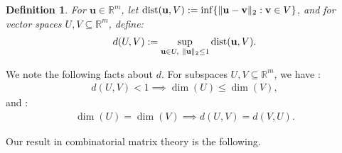 \documentclass[9pt,twocolumn]{pnas-new}
\newtheorem{lemma}{Lemma}
\newtheorem{definition}{Definition}
\begin{document}
\begin{definition}\label{dDef}
For $\mathbf{u} \in \mathbb R^m$, let $\text{\rm dist}(\mathbf{u}, V) := \inf \{\| \mathbf{u}-\mathbf{v} \|_2: \mathbf{v} \in V\}$, and for vector spaces $U,V \subseteq \mathbb{R}^m$, define:
\begin{align}\label{d}
d(U,V) := \sup_{\mathbf{u} \in U, \ \|\mathbf{u}\|_2 \leq 1} \text{\rm dist}(\mathbf{u},V).
\end{align}
\end{definition}

We note the following facts about $d$. For subspaces $U,V \subseteq \mathbb{R}^m$, we have \cite[Cor.~2.6]{Kato2013}:
\begin{align}\label{dimLem}
d(U,V) < 1 \implies \dim(U) \leq \dim(V),
\end{align}
%
and \cite[Lem.~3.2]{Morris10}:
\begin{align}\label{eqdim}
\dim(U) = \dim(V) \implies d(U,V) = d(V,U).
\end{align}



Our result in combinatorial matrix theory is the following.

\end{document}
